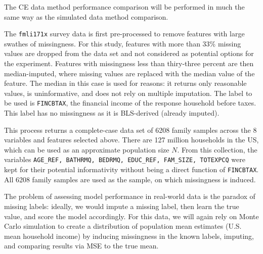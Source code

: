 \documentclass[12pt,twoside]{reedthesis}
\begin{document}
The CE data method performance comparison will be performed in much the
same way as the simulated data method comparison.

The \texttt{fmli171x} survey data is first pre-processed to remove
features with large swathes of missingness. For this study, features
with more than 33\% missing values are dropped from the data set and not
considered as potential options for the experiment. Features with
missingness less than thiry-three percent are then median-imputed, where
missing values are replaced with the median value of the feature. The
median in this case is used for reasons: it returns only reasonable
values, is uninformative, and does not rely on multiple imputation. The
label to be used is \texttt{FINCBTAX}, the financial income of the
response household before taxes. This label has no missingness as it is
BLS-derived (already imputed).

This process returns a complete-case data set of 6208 family samples
across the 8 variables and features selected above. There are 127
million households in the US, which can be used as an approximate
population size \(N\). From this collection, the variables
\texttt{AGE\_REF,\ BATHRMQ,\ BEDRMQ,\ EDUC\_REF,\ FAM\_SIZE,\ TOTEXPCQ}
were kept for their potential informativity without being a direct
function of \texttt{FINCBTAX}. All 6208 family samples are used as the
sample, on which missingness is induced.

The problem of assessing model performance in real-world data is the
paradox of missing labels: ideally, we would impute a missing label,
then learn the true value, and score the model accordingly. For this
data, we will again rely on Monte Carlo simulation to create a
distribution of population mean estimates (U.S. mean household income)
by inducing missingness in the known labels, imputing, and comparing
results via MSE to the true mean.
\end{document}
